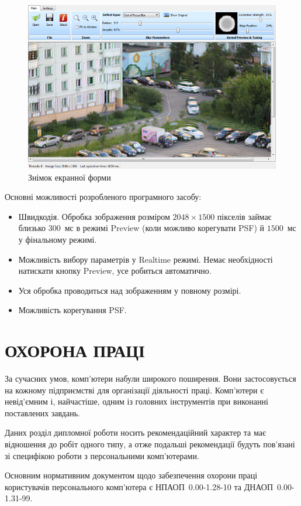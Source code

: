 \documentclass{diploma}
\begin{document}
  \begin{figure}[h]
    \centering
    \includegraphics[width=\linewidth]{gui.png}
    \caption{Знімок екранної форми}
    \label{fig:gui}
  \end{figure}

  Основні можливості розробленого програмного засобу:
  \begin{itemize}
    \item Швидкодія.
      Обробка зображення розміром $2048\times1500$ пікселів займає близько
      $300$~мс в режимі Preview (коли можливо корегувати PSF) й $1500$~мс у
      фінальному режимі.
    \item Можливість вибору параметрів у Realtime режимі.
      Немає необхідності натискати кнопку Preview, усе робиться автоматично.
    \item Уся обробка проводиться над зображенням у повному розмірі.
    \item Можливість корегування PSF.
  \end{itemize}
\chapter{ОХОРОНА ПРАЦІ}
  За сучасних умов, комп’ютери набули широкого поширення.
  Вони застосовується на кожному підприємстві для організації діяльності
  праці.
  Комп’ютери є невід’ємним і, найчастіше, одним із головних інструментів при
  виконанні поставлених завдань.

  Даних розділ дипломної роботи носить рекомендаційний характер та має
  відношення до робіт одного типу, а отже подальші рекомендації будуть
  пов’язані зі специфікою роботи з персональними комп’ютерами.

  Основним нормативним документом щодо забезпечення охорони праці користувачів
  персонального комп’ютера є НПАОП~0.00-1.28-10\cite{npaop128} та
  ДНАОП~0.00-1.31-99\cite{dnaop131}.
  \clearpage
\end{document}
